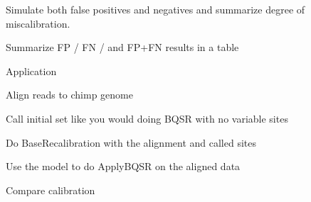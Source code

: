 \documentclass{article}
\begin{document}
\begin{outline}	
	\item Simulate both false positives and negatives and summarize degree of miscalibration.
	\item Summarize FP / FN / and FP+FN results in a table
	\item Application
	\begin{outline}
		\item Align reads to chimp genome
		\item Call initial set like you would doing BQSR with no variable sites
		\item Do BaseRecalibration with the alignment and called sites
		\item Use the model to do ApplyBQSR on the aligned data
		\item Compare calibration
	\end{outline}
\end{outline}
\end{document}
